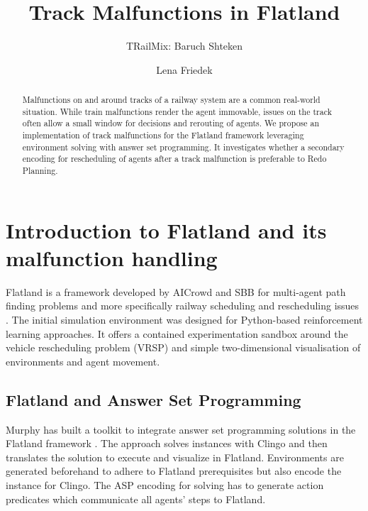 \documentclass[runningheads]{llncs}
\begin{document}
%
\title{Track Malfunctions in Flatland}
%
%
\author{TRailMix: Baruch Shteken \and
Lena Friedek}
%
%
%
\maketitle              %
%
\begin{abstract}
Malfunctions on and around tracks of a railway system are a common real-world situation. While train malfunctions render the agent immovable, issues on the track often allow a small window for decisions and rerouting of agents. We propose an implementation of track malfunctions for the Flatland framework leveraging environment solving with answer set programming. It investigates whether a secondary encoding for rescheduling of agents after a track malfunction is preferable to Redo Planning. 

\end{abstract}
%

\section{Introduction to Flatland and its malfunction handling}
Flatland is a framework developed by AICrowd and SBB for multi-agent path finding problems and more specifically railway scheduling and rescheduling issues \cite{mohanty2020}. The initial simulation environment was designed for Python-based reinforcement learning approaches. It offers a contained experimentation sandbox around the vehicle rescheduling problem (VRSP) and simple two-dimensional visualisation of environments and agent movement.



\subsection{Flatland and Answer Set Programming}
Murphy has built a toolkit to integrate answer set programming solutions in the Flatland framework \cite{Murphy2026a}. The approach solves instances with Clingo \cite{gebser2018clingo} and then translates the solution to execute and visualize in Flatland. Environments are generated beforehand to adhere to Flatland prerequisites but also encode the instance for Clingo. The ASP encoding for solving has to generate action predicates which communicate all agents' steps to Flatland.  
\end{document}
